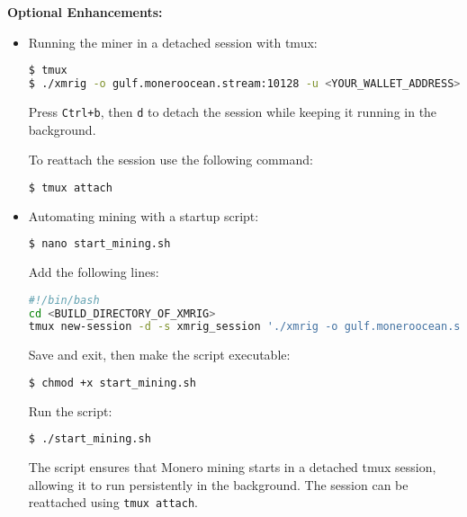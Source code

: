 \vspace{0.5cm}

\noindent \textbf{Optional Enhancements:}
\begin{itemize}
\item Running the miner in a detached session with tmux:
\begin{lstlisting}[language=bash, breaklines=true, breakatwhitespace=true, columns=fullflexible]
$ tmux
$ ./xmrig -o gulf.moneroocean.stream:10128 -u <YOUR_WALLET_ADDRESS> -p <WORKER_NAME>
\end{lstlisting}
Press \texttt{Ctrl+b}, then \texttt{d} to detach the session while keeping it running in the background.

To reattach the session use the following command:
\begin{lstlisting}[language=bash, breaklines=true, breakatwhitespace=true, columns=fullflexible]
$ tmux attach
\end{lstlisting}
        
\item Automating mining with a startup script:
\begin{lstlisting}[language=bash, breaklines=true, breakatwhitespace=true, columns=fullflexible]
$ nano start_mining.sh
\end{lstlisting}
Add the following lines:
\begin{lstlisting}[language=bash, breaklines=true, breakatwhitespace=true, columns=fullflexible]
#!/bin/bash
cd <BUILD_DIRECTORY_OF_XMRIG>
tmux new-session -d -s xmrig_session './xmrig -o gulf.moneroocean.stream:10128 -u <YOUR_WALLET_ADDRESS> -p <WORKER_NAME>'
\end{lstlisting}
Save and exit, then make the script executable:
\begin{lstlisting}[language=bash, breaklines=true, breakatwhitespace=true, columns=fullflexible]
$ chmod +x start_mining.sh
\end{lstlisting}
Run the script:
\begin{lstlisting}[language=bash, breaklines=true, breakatwhitespace=true, columns=fullflexible]
$ ./start_mining.sh
\end{lstlisting}
The script ensures that Monero mining starts in a detached tmux session, allowing it to run persistently in the background. The session can be reattached using \texttt{tmux attach}.
\end{itemize}